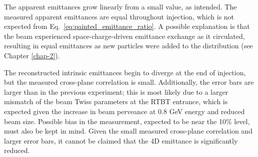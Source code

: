 %
The apparent emittances grow linearly from a small value, as intended. The measured apparent emittances are equal throughout injection, which is not expected from Eq.~\ref{eq:painted_emittance_ratio}. A possible explanation is that the beam experienced space-charge-driven emittance exchange as it circulated, resulting in equal emittances as new particles were added to the distribution (see Chapter \ref{chap-2}). 

The reconstructed intrinsic emittances begin to diverge at the end of injection, but the measured cross-plane correlation is small. Additionally, the error bars are larger than in the previous experiment; this is most likely due to a larger mismatch of the beam Twiss parameters at the RTBT entrance, which is expected given the increase in beam perveance at 0.8 GeV energy and reduced beam size. Possible bias in the measurement, expected to be near the 10\% level, must also be kept in mind. Given the small measured cross-plane correlation and larger error bars, it cannot be claimed that the 4D emittance is significantly reduced. 

